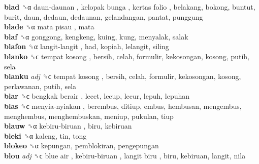 \textbf{blad} ␝α   daun-daunan ,  kelopak bunga ,  kertas folio , belakang, bokong, buntut, burit, daun, dedaun, dedaunan, gelandangan, pantat, punggung  \\
\textbf{blade} ␝α   mata pisau , mata  \\
\textbf{blaf} ␝α  gonggong, kengkeng, kuing, kung, menyalak, salak  \\
\textbf{blafon} ␝α   langit-langit , had, kopiah, lelangit, siling  \\
\textbf{blanko} ␝ϲ   tempat kosong , bersih, celah, formulir, kekosongan, kosong, putih, sela  \\
\textbf{blanku} \emph{adj}  ␝ϲ   tempat kosong , bersih, celah, formulir, kekosongan, kosong, perlawanan, putih, sela  \\
\textbf{blar} ␝ϲ   bengkak berair , lecet, lecup, lecur, lepuh, lepuhan  \\
\textbf{blas} ␝ϲ   menyia-nyiakan , berembus, ditiup, embus, hembusan, mengembus, menghembus, menghembuskan, meniup, pukulan, tiup  \\
\textbf{blauw} ␝α   kebiru-biruan , biru, kebiruan  \\
\textbf{bleki} ␝α  kaleng, tin, tong  \\
\textbf{blokeo} ␝α  kepungan, pemblokiran, pengepungan  \\
\textbf{blou} \emph{adj}  ␝ϲ   blue air ,  kebiru-biruan ,  langit biru , biru, kebiruan, langit, nila  \\
